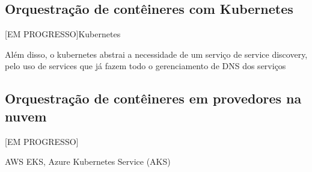 
\subsection{Orquestração de contêineres com Kubernetes}
[EM PROGRESSO]Kubernetes

Além disso, o kubernetes abstrai a necessidade de um serviço de service discovery, pelo uso de services que já fazem todo o gerenciamento de DNS dos serviços



\subsection{Orquestração de contêineres em provedores na nuvem}
[EM PROGRESSO]

AWS EKS, Azure Kubernetes Service (AKS)







